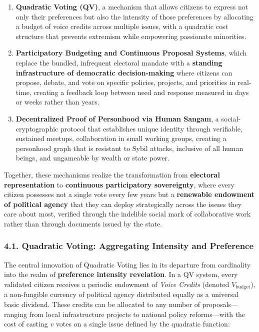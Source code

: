 \begin{enumerate}
\def\labelenumi{\arabic{enumi}.}
\item
  \textbf{Quadratic Voting (QV)}, a mechanism that allows citizens to
  express not only their preferences but also the intensity of those
  preferences by allocating a budget of voice credits across multiple
  issues, with a quadratic cost structure that prevents extremism while
  empowering passionate minorities.
\item
  \textbf{Participatory Budgeting and Continuous Proposal Systems},
  which replace the bundled, infrequent electoral mandate with a
  \textbf{standing infrastructure of democratic decision-making} where
  citizens can propose, debate, and vote on specific policies, projects,
  and priorities in real-time, creating a feedback loop between need and
  response measured in days or weeks rather than years.
\item
  \textbf{Decentralized Proof of Personhood via Human Sangam}, a
  social-cryptographic protocol that establishes unique identity through
  verifiable, sustained meetups, collaboration in small working groups,
  creating a personhood graph that is resistant to Sybil attacks,
  inclusive of all human beings, and ungameable by wealth or state
  power.
\end{enumerate}

Together, these mechanisms realize the transformation from
\textbf{electoral representation} to \textbf{continuous participatory
sovereignty}, where every citizen possesses not a single vote every few
years but a \textbf{renewable endowment of political agency} that they
can deploy strategically across the issues they care about most,
verified through the indelible social mark of collaborative work rather
than through documents issued by the state.

\subsubsection{4.1. Quadratic Voting: Aggregating Intensity and
Preference}\label{quadratic-voting-aggregating-intensity-and-preference}

The central innovation of Quadratic Voting lies in its departure from
cardinality into the realm of \textbf{preference intensity revelation}.
In a QV system, every validated citizen receives a periodic endowment of
\emph{Voice Credits} (denoted \(V_{\text{budget}}\)), a non-fungible
currency of political agency distributed equally as a universal basic
dividend. These credits can be allocated to any number of
proposals---ranging from local infrastructure projects to national
policy reforms---with the cost of casting \(v\) votes on a single issue
defined by the quadratic function:

